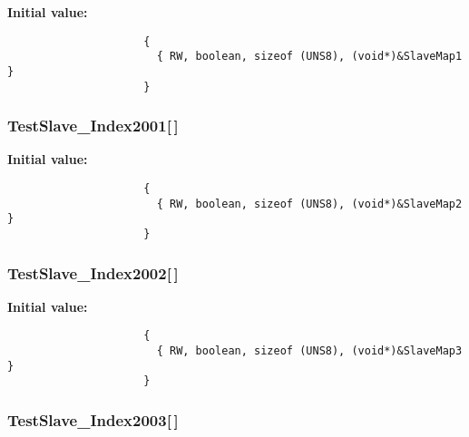 \textbf{Initial value:}

\begin{Code}\begin{verbatim} 
                     {
                       { RW, boolean, sizeof (UNS8), (void*)&SlaveMap1 }
                     }
\end{verbatim}\end{Code}
\subsubsection{ {\bf Test\-Slave\_\-Index2001}[$\,$]}\label{TestSlave_8c_2b603460e3d364a211563d99831b659f}


\textbf{Initial value:}

\begin{Code}\begin{verbatim} 
                     {
                       { RW, boolean, sizeof (UNS8), (void*)&SlaveMap2 }
                     }
\end{verbatim}\end{Code}
\subsubsection{ {\bf Test\-Slave\_\-Index2002}[$\,$]}\label{TestSlave_8c_aae3199a31a464aec97787df213beed1}


\textbf{Initial value:}

\begin{Code}\begin{verbatim} 
                     {
                       { RW, boolean, sizeof (UNS8), (void*)&SlaveMap3 }
                     }
\end{verbatim}\end{Code}
\subsubsection{ {\bf Test\-Slave\_\-Index2003}[$\,$]}\label{TestSlave_8c_23dbb6390626fda247afa08b478401bc}


